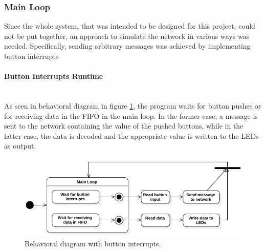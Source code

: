 \subsubsection{Main Loop}
Since the whole system, that was intended to be designed for this project, could not be put together, an approach to simulate the network in various ways was needed.
Specifically, sending arbitrary messages was achieved by implementing button interrupts

\paragraph{Button Interrupts Runtime}~\\
As seen in behavioral diagram in figure \ref{fig:StateDiagram_CANSoft_BtnsIntr}, the program waits for button pushes or for receiving data in the FIFO in the main loop.
In the former case, a message is sent to the network containing the value of the pushed buttons, while in the latter case, the data is decoded and the appropriate value is written to the LEDs as output.
\begin{figure}[h!]
	\centering
	\includegraphics[width = 1\linewidth]{graphics/StateDiagram_CANSoft_BtnsIntr.pdf}
	\caption{Behavioral diagram with button interrupts.}
	\label{fig:StateDiagram_CANSoft_BtnsIntr}
\end{figure}

